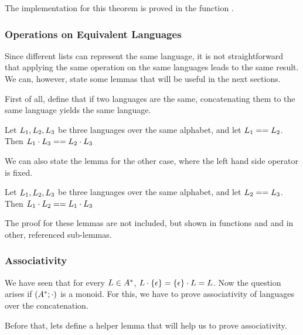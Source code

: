The implementation for this theorem is proved in the function .

\subsubsection{Operations on Equivalent Languages}

Since different lists can represent the same language, it is not straightforward that applying the same operation on the same languages leads to the same result. We can, however, state some lemmas that will be useful in the next sections.

First of all, define that if two languages are the same, concatenating them to the same language yields the same language.

\begin{lemma}
	\label{lem:clContentEquals}
	Let $L_{1}, L_{2}, L_{3}$ be three languages over the same alphabet, and let $L_{1} == L_{2}$. Then $L_{1} \cdot L_{3} == L_{2} \cdot L_{3}$ 
\end{lemma}

We can also state the lemma for the other case, where the left hand side operator is fixed.

\begin{lemma}
	\label{lem:clContentEquals2}
	Let $L_{1}, L_{2}, L_{3}$ be three languages over the same alphabet, and let $L_{2} == L_{3}$. Then $L_{1} \cdot L_{2} == L_{1} \cdot L_{3}$ 
\end{lemma}

The proof for these lemmas are not included, but shown in functions  and  and in other, referenced sub-lemmas.


\subsubsection{Associativity}

We have seen that for every $L \in A^{*}$, $L \cdot \{\epsilon\} = \{\epsilon\} \cdot L = L$. Now the question arises if $(A^{*};\cdot)$ is a monoid. For this, we have to prove associativity of languages over the concatenation.

Before that, lets define a helper lemma that will help us to prove associativity. 

